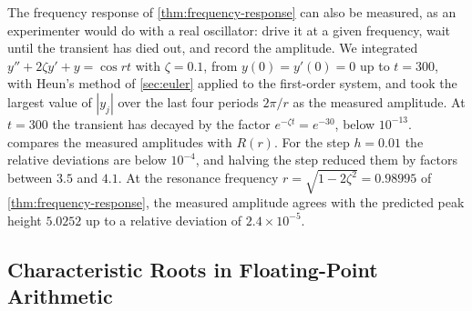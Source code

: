 The frequency response of \cref{thm:frequency-response} can also be measured, as an experimenter would do with a real oscillator: drive it at a given frequency, wait until the transient has died out, and record the amplitude. We integrated $y''+2\zeta y'+y=\cos rt$ with $\zeta=0.1$, from $y(0)=y'(0)=0$ up to $t=300$, with Heun's method of \cref{sec:euler} applied to the first-order system, and took the largest value of $|y_j|$ over the last four periods $2\pi/r$ as the measured amplitude. At $t=300$ the transient has decayed by the factor $e^{-\zeta t}=e^{-30}$, below $10^{-13}$.  compares the measured amplitudes with $R(r)$. For the step $h=0.01$ the relative deviations are below $10^{-4}$, and halving the step reduced them by factors between $3.5$ and $4.1$. At the resonance frequency $r=\sqrt{1-2\zeta^2}=0.98995$ of \cref{thm:frequency-response}, the measured amplitude agrees with the predicted peak height $5.0252$ up to a relative deviation of $2.4\times10^{-5}$.

\begin{table}
\end{table}

\subsection{Characteristic Roots in Floating-Point Arithmetic}

